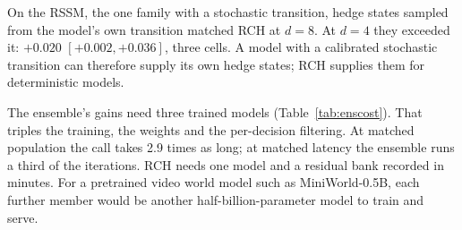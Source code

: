 \documentclass[pdflatex,sn-nature]{sn-jnl}%
\begin{document}
On the RSSM, the one family with a stochastic transition, hedge states sampled from the model's own transition matched RCH at $d=8$. At $d=4$ they exceeded it: $+0.020$ $[+0.002, +0.036]$, three cells. A model with a calibrated stochastic transition can therefore supply its own hedge states; RCH supplies them for deterministic models.

The ensemble's gains need three trained models (Table~\ref{tab:enscost}). That triples the training, the weights and the per-decision filtering. At matched population the call takes 2.9 times as long; at matched latency the ensemble runs a third of the iterations. RCH needs one model and a residual bank recorded in minutes. For a pretrained video world model such as MiniWorld-0.5B, each further member would be another half-billion-parameter model to train and serve.
\end{document}
